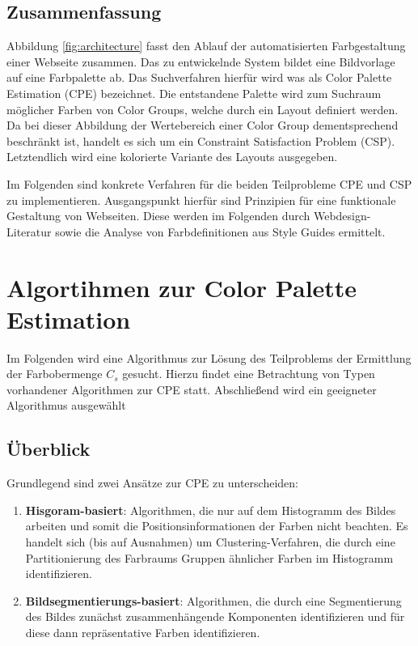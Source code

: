 \documentclass[11pt, bibliography=totoc]{scrartcl}
\begin{document}
\subsection*{Zusammenfassung}

Abbildung \ref{fig:architecture} fasst den Ablauf der automatisierten Farbgestaltung einer Webseite zusammen. Das zu entwickelnde System bildet eine Bildvorlage auf eine Farbpalette ab. Das Suchverfahren hierfür wird was als Color Palette Estimation (CPE) bezeichnet. Die entstandene Palette wird zum Suchraum möglicher Farben von Color Groups, welche durch ein Layout definiert werden. Da bei dieser Abbildung der Wertebereich einer Color Group dementsprechend beschränkt ist, handelt es sich um ein Constraint Satisfaction Problem (CSP). Letztendlich wird eine kolorierte Variante des Layouts ausgegeben.

Im Folgenden sind konkrete Verfahren für die beiden Teilprobleme CPE und CSP zu implementieren. Ausgangspunkt hierfür sind Prinzipien für eine funktionale Gestaltung von Webseiten. Diese werden im Folgenden durch Webdesign-Literatur sowie die Analyse von Farbdefinitionen aus Style Guides ermittelt.






\section{Algortihmen zur Color Palette Estimation}

Im Folgenden wird eine Algorithmus zur Lösung des Teilproblems der Ermittlung der Farbobermenge $C_s$ gesucht. Hierzu findet eine Betrachtung von Typen vorhandener Algorithmen zur CPE statt. Abschließend wird ein geeigneter Algorithmus ausgewählt

\subsection{Überblick}

Grundlegend sind zwei Ansätze zur CPE zu unterscheiden:
\begin{enumerate}
    \item \textbf{Hisgoram-basiert}: Algorithmen, die nur auf dem Histogramm des Bildes arbeiten und somit die Positionsinformationen der Farben nicht beachten. Es handelt sich (bis auf Ausnahmen) um Clustering-Verfahren, die durch eine Partitionierung des Farbraums Gruppen ähnlicher Farben im Histogramm identifizieren.
    \item \textbf{Bildsegmentierungs-basiert}: Algorithmen, die durch eine Segmentierung des Bildes zunächst zusammenhängende Komponenten identifizieren und für diese dann repräsentative Farben identifizieren.
\end{enumerate}
\end{document}
